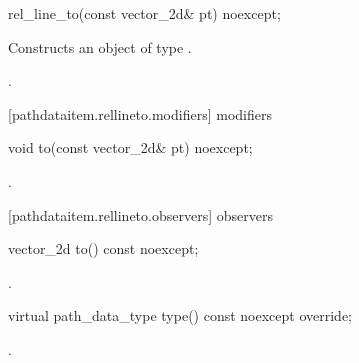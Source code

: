\begin{itemdecl}
    rel_line_to(const vector_2d& pt) noexcept;
\end{itemdecl}
\begin{itemdescr}
	\pnum
	\effects
	Constructs an object of type .
	
	\pnum
	\postconditions
	.
\end{itemdescr}

 [pathdataitem.rellineto.modifiers]{ modifiers}

\begin{itemdecl}
    void to(const vector_2d& pt) noexcept;
\end{itemdecl}
\begin{itemdescr}
	\pnum
	\postconditions
	.
	
\end{itemdescr}

 [pathdataitem.rellineto.observers]{ observers}

\begin{itemdecl}
    vector_2d to() const noexcept;
\end{itemdecl}
\begin{itemdescr}
	\pnum
	\returns
	.

\end{itemdescr}

\begin{itemdecl}
    virtual path_data_type type() const noexcept override;
\end{itemdecl}
\begin{itemdescr}
	\pnum
	\returns
	.

\end{itemdescr}
